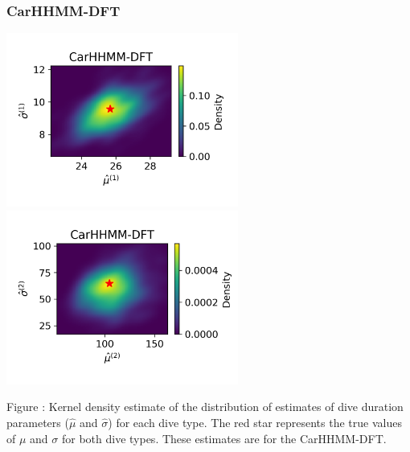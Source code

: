 \documentclass{article}
\begin{document}
        \subsubsection{CarHHMM-DFT}
        \begin{center}
        \includegraphics[width=3in]{../Plots/hhmm_FV_MLE_density_dive_duration_-1_0.png}
        \includegraphics[width=3in]{../Plots/hhmm_FV_MLE_density_dive_duration_-1_1.png}
        \end{center}
        
        \noindent Figure : Kernel density estimate of the distribution of estimates of dive duration parameters ($\hat \mu$ and $\hat \sigma$) for each dive type. The red star represents the true values of $\mu$ and $\sigma$ for both dive types. These estimates are for the CarHHMM-DFT.
        \addtocounter{fignum}{1}
        
\end{document}
